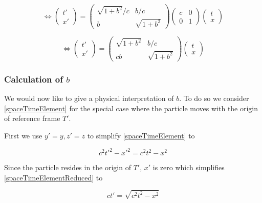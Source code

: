 \documentclass{article}
\begin{document}
\begin{equation}
\iff
\left(\begin{array}{c}
t'
\\
x'
\end{array} \right)
=
\begin{pmatrix}
\sqrt{1+b^2} /c & b /c
\\
b & \sqrt{1+b^2}
\end{pmatrix}
\begin{pmatrix}
c & 0
\\
0 & 1
\end{pmatrix}
\left(\begin{array}{c}
t
\\
x
\end{array} \right)
\end{equation}

\begin{equation} \label{transformationBasedOnb}
\iff
\left(\begin{array}{c}
t'
\\
x'
\end{array} \right)
=
\begin{pmatrix}
\sqrt{1+b^2} & b /c
\\
c b  & \sqrt{1+b^2}
\end{pmatrix}
\left(\begin{array}{c}
t
\\
x
\end{array} \right)
\end{equation}

\subsubsection{Calculation of $b$} \label{calcOfB}

We would now like to give a physical interpretation of $b$.
To do so we consider \ref{spaceTimeElement} for the special case where the particle moves with the origin of reference frame $T'$.

First we use $y'=y, z'=z$ to simplify \ref{spaceTimeElement} to

\begin{equation} \label{spaceTimeElementReduced}
c^2t'^2-x'^2 = c^2t^2-x^2
\end{equation}

Since the particle resides in the origin of $T'$, $x'$ is zero which simplifies \ref{spaceTimeElementReduced} to

\begin{equation}
ct' = \sqrt{c^2 t^2 - x^2}
\end{equation}
\end{document}
